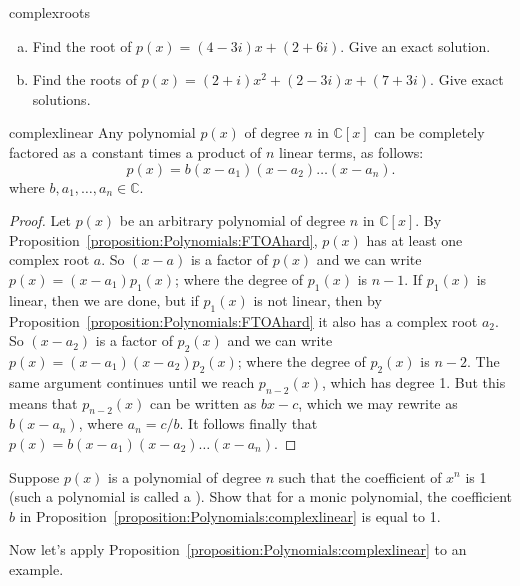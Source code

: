 \begin{exercise}{complexroots}
\begin {enumerate}[(a)]
\item
Find the root of $p(x)=(4-3i)x+(2+6i)$. Give an exact solution.
\item
Find the roots of $p(x)=(2+i)x^2+(2-3i)x+(7+3i)$. Give exact solutions. 
\end{enumerate}
\end{exercise}

\begin{prop}{complexlinear}
Any polynomial $p(x)$  of degree $n$ in $\mathbb{C}[x]$ can be completely factored as a constant times a product of $n$ linear terms,   as follows:
\begin{equation}
p(x) = b(x -a_1)(x-a_2) \ldots (x - a_n).
\end{equation}
where $b, a_1, \ldots, a_n \in {\mathbb C}$.
\end{prop}

\begin{proof}{} 
Let $p(x)$ be an arbitrary polynomial of degree $n$ in $\mathbb{C}[x]$. By Proposition~\ref{proposition:Polynomials:FTOAhard}, $p(x)$ has at least one complex root $a$. So $(x-a)$ is a factor of $p(x)$ and we can write $p(x)=(x-a_1)p_1(x)$; where the degree of $p_1(x)$ is $n-1$. If $p_1(x)$ is linear, then we are done, but if $p_1(x)$ is not linear, then by Proposition~\ref{proposition:Polynomials:FTOAhard} it also has a complex root $a_2$. So $(x-a_2)$ is a factor of $p_2(x)$ and we can write $p(x)=(x-a_1)(x-a_2)p_2(x)$; where the degree of $p_2(x)$ is $n-2$. The same argument continues until we reach $p_{n-2}(x)$, which has degree 1. But this means that $p_{n-2}(x)$ can be written as $bx - c$, which we may rewrite as $b(x-a_n)$, where $a_n = c/b$.  It follows finally that $p(x) =b (x-a_1)(x-a_2) \ldots (x-a_n) $.
\end{proof}

\begin{exercise}{}
Suppose $p(x)$ is a polynomial of degree $n$ such that the coefficient of $x^n$ is 1 (such a polynomial is called a ). Show that for a monic polynomial, the coefficient $b$ in 
Proposition~\ref{proposition:Polynomials:complexlinear} is equal to 1.
\end{exercise}

Now let's apply Proposition~\ref{proposition:Polynomials:complexlinear} to an example.

